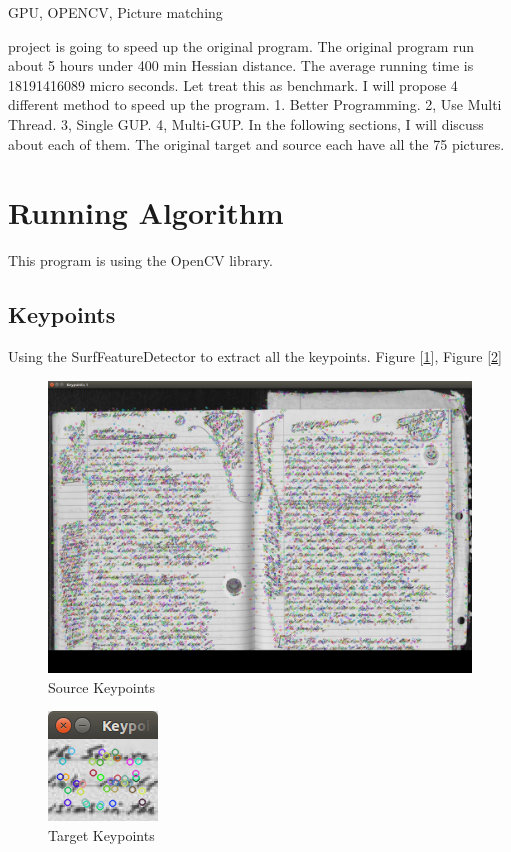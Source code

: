\documentclass[journal]{IEEEtran}
\begin{document}
\begin{IEEEkeywords}
GPU, OPENCV, Picture matching
\end{IEEEkeywords}

 project is going to speed up the original program. 
The original program run about 5 hours under 400 min Hessian distance. The average running time is 18191416089 micro seconds. Let treat this as benchmark. I will propose 4 different method to speed up the program. 1. Better Programming. 2, Use Multi Thread. 3, Single GUP. 4, Multi-GUP. In the following sections, I will discuss about each of them. The original target and source each have all the 75 pictures. 
\section{Running Algorithm}
This program is using the OpenCV library. 
\subsection*{Keypoints}
Using the SurfFeatureDetector to extract all the keypoints. Figure [\ref{fig:figure3}], Figure [\ref{fig:figure4}]
		\begin{figure}[h]
			\centering
			\includegraphics[scale=0.15]{Figure/SourceKeyPoints.png}
			\caption{Source Keypoints}
			\label{fig:figure3}
		\end{figure} 

		\begin{figure}[h]
			\centering
			\includegraphics[scale=0.30]{Figure/target.png}
			\caption{Target Keypoints}
			\label{fig:figure4}
		\end{figure} 
\end{document}
